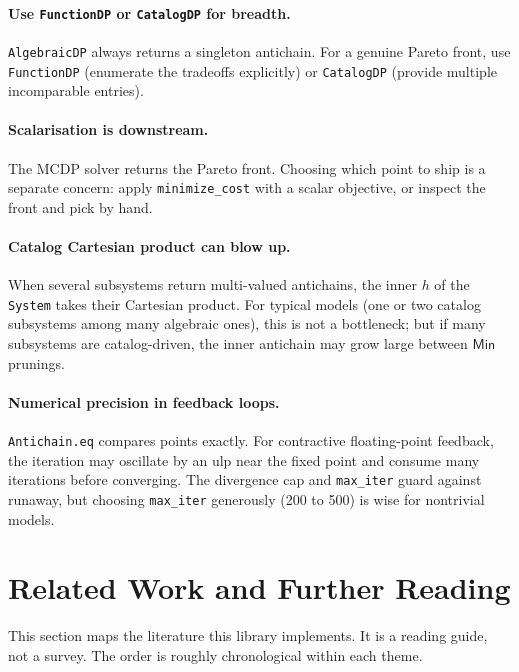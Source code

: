 \documentclass[11pt,a4paper]{article}
\newcommand{\Min}{\mathsf{Min}}
\begin{document}
\paragraph{Use \texttt{FunctionDP} or \texttt{CatalogDP} for breadth.}
\texttt{AlgebraicDP} always returns a singleton antichain. For a
genuine Pareto front, use \texttt{FunctionDP} (enumerate the
tradeoffs explicitly) or \texttt{CatalogDP} (provide multiple
incomparable entries).

\paragraph{Scalarisation is downstream.} The MCDP solver returns the
Pareto front. Choosing which point to ship is a separate concern:
apply \texttt{minimize\_cost} with a scalar objective, or inspect the
front and pick by hand.

\paragraph{Catalog Cartesian product can blow up.} When several
subsystems return multi-valued antichains, the inner $h$ of the
\texttt{System} takes their Cartesian product. For typical models
(one or two catalog subsystems among many algebraic ones), this is
not a bottleneck; but if many subsystems are catalog-driven, the
inner antichain may grow large between $\Min$ prunings.

\paragraph{Numerical precision in feedback loops.}
\texttt{Antichain.eq} compares points exactly. For contractive
floating-point feedback, the iteration may oscillate by an ulp near
the fixed point and consume many iterations before converging. The
divergence cap and \texttt{max\_iter} guard against runaway, but
choosing \texttt{max\_iter} generously (200 to 500) is wise for
nontrivial models.

\section{Related Work and Further Reading}
\label{sec:related}

This section maps the literature this library implements. It is a reading
guide, not a survey. The order is roughly chronological within each theme.
\end{document}
